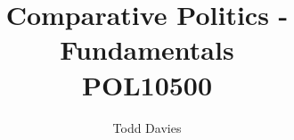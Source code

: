 \newcommand{\coursename}{Comparative Politics - Fundamentals}
\newcommand{\coursecode}{POL10500}
\newcommand{\courseinfo}{}
\newcommand{\Author}{Todd Davies} 
\newcommand{\Title}{Comparative Politics - Fundamentals\\POL10500}
\author{\Author}
\title{\Title}

